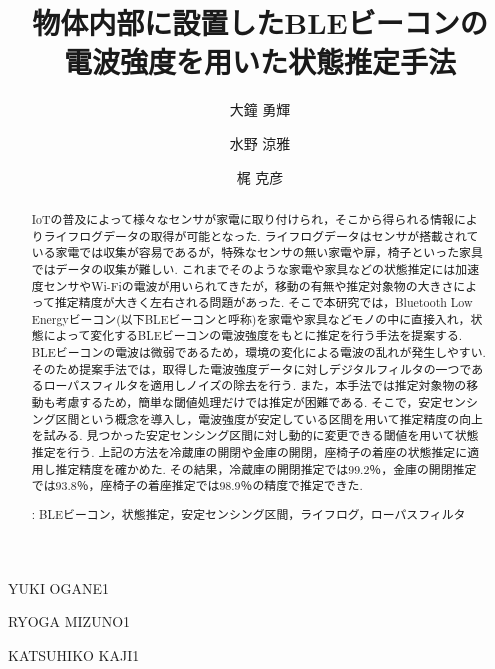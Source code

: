 \documentclass[Japanese]{dicomopapers}
\begin{document}
\title{物体内部に設置したBLEビーコンの\\電波強度を用いた状態推定手法}



\author{大鐘 勇輝}{YUKI OGANE}{1}
\author{水野 涼雅}{RYOGA MIZUNO}{1}
\author{梶 克彦}{KATSUHIKO KAJI}{1}




\begin{abstract}
IoTの普及によって様々なセンサが家電に取り付けられ，そこから得られる情報によりライフログデータの取得が可能となった.
ライフログデータはセンサが搭載されている家電では収集が容易であるが，特殊なセンサの無い家電や扉，椅子といった家具ではデータの収集が難しい.
これまでそのような家電や家具などの状態推定には加速度センサやWi-Fiの電波が用いられてきたが，移動の有無や推定対象物の大きさによって推定精度が大きく左右される問題があった.
そこで本研究では，Bluetooth Low Energyビーコン(以下BLEビーコンと呼称)を家電や家具などモノの中に直接入れ，状態によって変化するBLEビーコンの電波強度をもとに推定を行う手法を提案する.
BLEビーコンの電波は微弱であるため，環境の変化による電波の乱れが発生しやすい.
そのため提案手法では，取得した電波強度データに対しデジタルフィルタの一つであるローパスフィルタを適用しノイズの除去を行う.
また，本手法では推定対象物の移動も考慮するため，簡単な閾値処理だけでは推定が困難である.
そこで，安定センシング区間という概念を導入し，電波強度が安定している区間を用いて推定精度の向上を試みる.
見つかった安定センシング区間に対し動的に変更できる閾値を用いて状態推定を行う.
上記の方法を冷蔵庫の開閉や金庫の開閉，座椅子の着座の状態推定に適用し推定精度を確かめた.
その結果，冷蔵庫の開閉推定では99.2％，金庫の開閉推定では93.8％，座椅子の着座推定では98.9％の精度で推定できた.

 : BLEビーコン，状態推定，安定センシング区間，ライフログ，ローパスフィルタ



\end{abstract}

\maketitle
\end{document}
